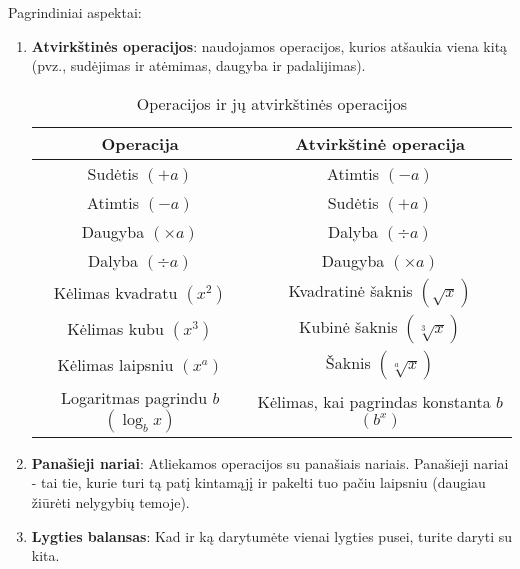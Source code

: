 \documentclass[a4paper]{article}
\begin{document}
Pagrindiniai aspektai:
\begin{enumerate}
      \item \textbf{Atvirkštinės operacijos}:
            naudojamos operacijos, kurios atšaukia viena kitą (pvz., sudėjimas
            ir atėmimas, daugyba ir padalijimas).

            \begin{table}[h]
                  \centering
                  \begin{tabular}{cc}
                        \toprule
                        Operacija                                & Atvirkštinė
                        operacija
                        \\
                        \midrule
                        Sudėtis $(+a)$                           & Atimtis
                        $(-a)$
                        \\
                        Atimtis $(-a)$                           & Sudėtis
                        $(+a)$
                        \\
                        Daugyba $(\times a)$                     & Dalyba
                        $(\div a)$
                        \\
                        Dalyba $(\div a)$                        & Daugyba
                        $(\times
                              a)$
                        \\
                        Kėlimas kvadratu $(x^2)$                 & Kvadratinė
                        šaknis
                        $(\sqrt{x})$
                        \\
                        Kėlimas kubu $(x^3)$                     & Kubinė
                        šaknis
                        $(\sqrt[3]{x})$
                        \\
                        Kėlimas laipsniu $(x^a)$                 & Šaknis
                        \((\sqrt[a]{x})\)
                        \\
                        Logaritmas pagrindu  \(b\) $(\log_b{x})$ & Kėlimas, kai
                        pagrindas konstanta \(b\) $(b^x)$
                        \\
                        \bottomrule
                  \end{tabular}
                  \caption{Operacijos ir jų atvirkštinės operacijos}
                  \label{tab:inverse_operations}
            \end{table}

      \item \textbf{Panašieji nariai}: Atliekamos operacijos su panašiais
            nariais. Panašieji nariai - tai tie, kurie turi tą patį kintamąjį
            ir pakelti
            tuo pačiu laipsniu (daugiau žiūrėti nelygybių temoje).
      \item \textbf{Lygties balansas}: Kad ir ką darytumėte vienai lygties
            pusei, turite daryti su kita.
\end{enumerate}
\end{document}
